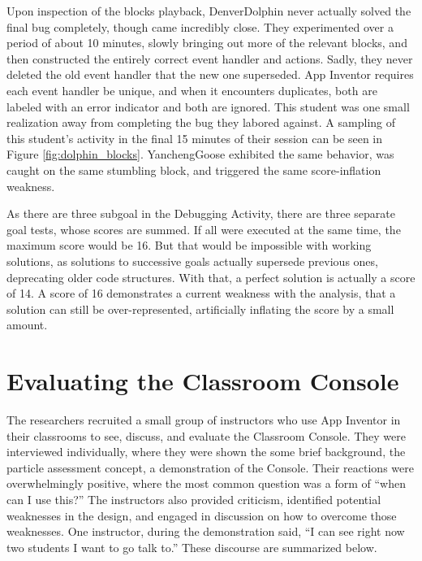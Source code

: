 Upon inspection of the blocks playback, DenverDolphin never actually solved the final bug completely, though came incredibly close. They experimented over a period of about 10 minutes, slowly bringing out more of the relevant blocks, and then constructed the entirely correct event handler and actions. Sadly, they never deleted the old event handler that the new one superseded. App Inventor requires each event handler be unique, and when it encounters duplicates, both are labeled with an error indicator and both are ignored. This student was one small realization away from completing the bug they labored against. A sampling of this student's activity in the final 15 minutes of their session can be seen in Figure \ref{fig:dolphin_blocks}. YanchengGoose exhibited the same behavior, was caught on the same stumbling block, and triggered the same score-inflation weakness. 

As there are three subgoal in the Debugging Activity, there are three separate goal tests, whose scores are summed. If all were executed at the same time, the maximum score would be 16. But that would be impossible with working solutions, as solutions to successive goals actually supersede previous ones, deprecating older code structures. With that, a perfect solution is actually a score of 14. A score of 16 demonstrates a current weakness with the analysis, that a solution can still be over-represented, artificially inflating the score by a small amount.



\section{Evaluating the Classroom Console}
\label{sec:console_evaluation}

The researchers recruited a small group of instructors who use App Inventor in their classrooms to see, discuss, and evaluate the Classroom Console. They were interviewed individually, where they were shown the some brief background, the particle assessment concept, a demonstration of the Console. Their reactions were overwhelmingly positive, where the most common question was a form of ``when can I use this?'' The instructors also provided criticism, identified potential weaknesses in the design, and engaged in discussion on how to overcome those weaknesses. One instructor, during the demonstration said, ``I can see right now two students I want to go talk to.'' These discourse are summarized below.

